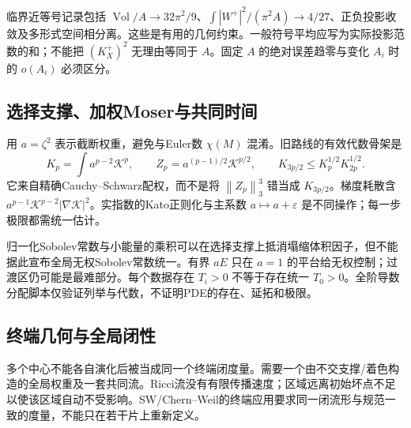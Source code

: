 \documentclass[UTF8,a4paper,11pt,fontset=fandol]{ctexart}
\numberwithin{equation}{section}
\theoremstyle{definition}
\newcommand{\Vol}{\operatorname{Vol}}
\newcommand{\norm}[1]{\left\lVert#1\right\rVert}
\begin{document}
临界近等号记录包括 $\Vol/A\to32\pi^2/9$、$\int|W^+|^2/(\pi^2A)\to4/27$、正负投影收敛及多形式空间相分离。这些是有用的几何约束。一般符号平均应写为实际投影范数的和；不能把 $(K_X^+)^2$ 无理由等同于 $A$。固定 $A$ 的绝对误差趋零与变化 $A_i$ 时的 $o(A_i)$ 必须区分。

\subsection{选择支撑、加权Moser与共同时间}
用 $a=\zeta^2$ 表示截断权重，避免与Euler数 $\chi(M)$ 混淆。旧路线的有效代数骨架是
\[
K_p=\int a^{p-2}\mathcal K^p,\qquad
Z_p=a^{(p-1)/2}\mathcal K^{p/2},\qquad
K_{3p/2}\le K_p^{1/2}K_{2p}^{1/2}.
\]
它来自精确Cauchy--Schwarz配权，而不是将 $\norm{Z_p}_3^3$ 错当成 $K_{3p/2}$。梯度耗散含 $a^{p-1}\mathcal K^{p-2}|\nabla\mathcal K|^2$。实指数的Kato正则化与主系数 $a\mapsto a+\varepsilon$ 是不同操作；每一步极限都需统一估计。

归一化Sobolev常数与小能量的乘积可以在选择支撑上抵消塌缩体积因子，但不能据此宣布全局无权Sobolev常数统一。有界 $aE$ 只在 $a=1$ 的平台给无权控制；过渡区仍可能是最难部分。每个数据存在 $T_i>0$ 不等于存在统一 $T_0>0$。全阶导数分配脚本仅验证列举与代数，不证明PDE的存在、延拓和极限。

\subsection{终端几何与全局闭性}
多个中心不能各自演化后被当成同一个终端闭度量。需要一个由不交支撑/着色构造的全局权重及一套共同流。Ricci流没有有限传播速度；区域远离初始坏点不足以使该区域自动不受影响。SW/Chern--Weil的终端应用要求同一闭流形与规范一致的度量，不能只在若干片上重新定义。
\end{document}
